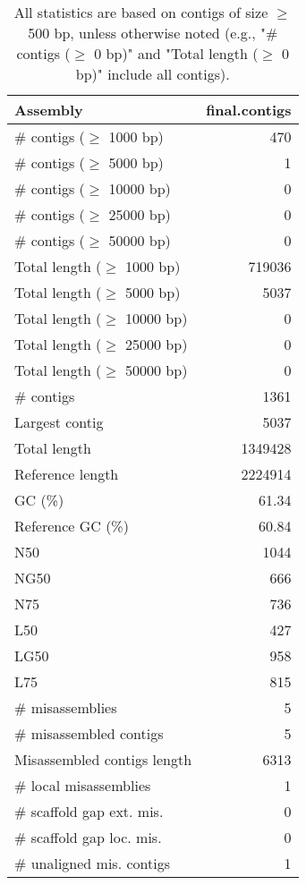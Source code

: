\documentclass[12pt,a4paper]{article}
\begin{document}
\begin{table}[ht]
\begin{center}
\caption{All statistics are based on contigs of size $\geq$ 500 bp, unless otherwise noted (e.g., "\# contigs ($\geq$ 0 bp)" and "Total length ($\geq$ 0 bp)" include all contigs).}
\begin{tabular}{|l*{1}{|r}|}
\hline
Assembly & final.contigs \\ \hline
\# contigs ($\geq$ 1000 bp) & 470 \\ \hline
\# contigs ($\geq$ 5000 bp) & 1 \\ \hline
\# contigs ($\geq$ 10000 bp) & 0 \\ \hline
\# contigs ($\geq$ 25000 bp) & 0 \\ \hline
\# contigs ($\geq$ 50000 bp) & 0 \\ \hline
Total length ($\geq$ 1000 bp) & 719036 \\ \hline
Total length ($\geq$ 5000 bp) & 5037 \\ \hline
Total length ($\geq$ 10000 bp) & 0 \\ \hline
Total length ($\geq$ 25000 bp) & 0 \\ \hline
Total length ($\geq$ 50000 bp) & 0 \\ \hline
\# contigs & 1361 \\ \hline
Largest contig & 5037 \\ \hline
Total length & 1349428 \\ \hline
Reference length & 2224914 \\ \hline
GC (\%) & 61.34 \\ \hline
Reference GC (\%) & 60.84 \\ \hline
N50 & 1044 \\ \hline
NG50 & 666 \\ \hline
N75 & 736 \\ \hline
L50 & 427 \\ \hline
LG50 & 958 \\ \hline
L75 & 815 \\ \hline
\# misassemblies & 5 \\ \hline
\# misassembled contigs & 5 \\ \hline
Misassembled contigs length & 6313 \\ \hline
\# local misassemblies & 1 \\ \hline
\# scaffold gap ext. mis. & 0 \\ \hline
\# scaffold gap loc. mis. & 0 \\ \hline
\# unaligned mis. contigs & 1 \\ \hline

\end{tabular}
\end{center}
\end{table}
\end{document}
